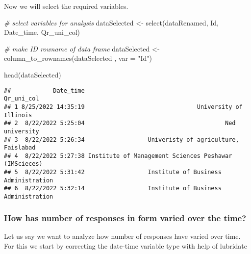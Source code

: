 \documentclass[
]{article}
\newenvironment{Shaded}{\begin{snugshade}}{\end{snugshade}}
\newcommand{\AttributeTok}[1]{\textcolor[rgb]{0.77,0.63,0.00}{#1}}
\newcommand{\CommentTok}[1]{\textcolor[rgb]{0.56,0.35,0.01}{\textit{#1}}}
\newcommand{\FunctionTok}[1]{\textcolor[rgb]{0.00,0.00,0.00}{#1}}
\newcommand{\NormalTok}[1]{#1}
\newcommand{\OtherTok}[1]{\textcolor[rgb]{0.56,0.35,0.01}{#1}}
\newcommand{\StringTok}[1]{\textcolor[rgb]{0.31,0.60,0.02}{#1}}
\begin{document}
Now we will select the required variables.

\begin{Shaded}
\begin{Highlighting}[]
\CommentTok{\# select variables for analysis}
\NormalTok{dataSelected }\OtherTok{\textless{}{-}} \FunctionTok{select}\NormalTok{(dataRenamed,}
\NormalTok{                       Id, Date\_time, Qr\_uni\_col)}

\CommentTok{\# make ID rowname of data frame}
\NormalTok{dataSelected }\OtherTok{\textless{}{-}} \FunctionTok{column\_to\_rownames}\NormalTok{(dataSelected , }\AttributeTok{var =} \StringTok{"Id"}\NormalTok{)}

\FunctionTok{head}\NormalTok{(dataSelected)}
\end{Highlighting}
\end{Shaded}

\begin{verbatim}
##            Date_time                                            Qr_uni_col
## 1 8/25/2022 14:35:19                                University of Illinois
## 2  8/22/2022 5:25:04                                        Ned university
## 3  8/22/2022 5:26:34                  Univeristy of agriculture, Faislabad
## 4  8/22/2022 5:27:38 Institute of Management Sciences Peshawar (IMScieces)
## 5  8/22/2022 5:31:42                  Institute of Business Administration
## 6  8/22/2022 5:32:14                  Institute of Business Administration
\end{verbatim}

\hypertarget{how-has-number-of-responses-in-form-varied-over-the-time}{%
\subsubsection{How has number of responses in form varied over the
time?}\label{how-has-number-of-responses-in-form-varied-over-the-time}}

Let us say we want to analyze how number of responses have varied over
time. For this we start by correcting the date-time variable type with
help of lubridate
\end{document}
